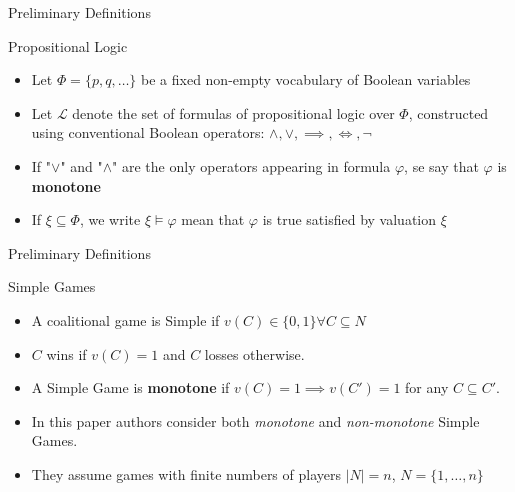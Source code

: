 \documentclass{beamer}
\begin{document}
\begin{frame}[fragile]{Preliminary Definitions}
  \begin{block}{Propositional Logic}
    \begin{itemize}
      \item Let $\Phi = \{p,q,\dots\}$ be a fixed non-empty vocabulary of Boolean variables    
      \item Let $\mathcal{L}$ denote the set of formulas of propositional logic over $\Phi$, constructed using conventional Boolean operators: 
      $\land, \lor, \implies, \iff, \neg$
      \item If "$\lor$" and "$\land$" are the only operators appearing in formula $\varphi$, se say that $\varphi$ is \textbf{monotone}
      \item If $\xi \subseteq \Phi$, we write $\xi \models \varphi$ mean that $\varphi$ is true satisfied by valuation $\xi$
    \end{itemize}
  \end{block}
\end{frame}

\begin{frame}[fragile]{Preliminary Definitions}
  \begin{block}{Simple Games}
    \begin{itemize}
      \item A coalitional game is Simple if $v(C) \in \{0,1\} \forall C \subseteq N$
      \item $C$ wins if $v(C) = 1$ and $C$ losses otherwise.  
      \item A Simple Game is \textbf{monotone} if $v(C) = 1 \implies v(C') = 1$ for any $C \subseteq C'$.
      \item In this paper authors consider both \textit{monotone} and \textit{non-monotone} Simple Games.
      \item They assume games with finite numbers of players $|N| = n$, $N = \{1,\dots,n\}$
    \end{itemize}
  \end{block}
\end{frame}
\end{document}
